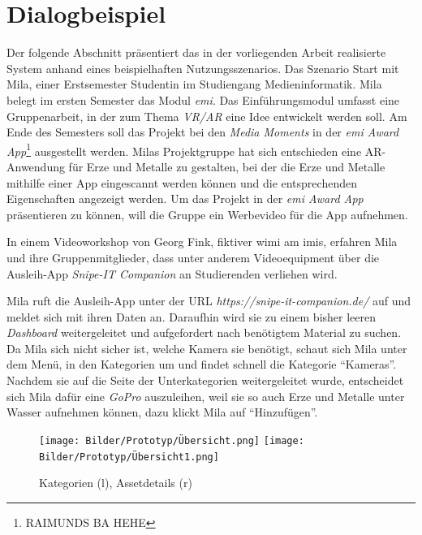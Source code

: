 \chapter{Dialogbeispiel}
\label{chapter-dialogbeispiel}

Der folgende Abschnitt präsentiert das in der vorliegenden Arbeit realisierte System anhand eines
beispielhaften Nutzungsszenarios. Das Szenario Start mit Mila, einer Erstsemester Studentin im
Studiengang Medieninformatik. Mila belegt im ersten Semester das Modul \textit{\ac{emi}}. Das
Einführungsmodul umfasst eine Gruppenarbeit, in der zum Thema \textit{VR/AR} eine Idee entwickelt
werden soll. Am Ende des Semesters soll das Projekt bei den \textit{Media Moments} in der
\textit{\ac{emi} Award App}\footnote{RAIMUNDS BA HEHE} ausgestellt werden. Milas Projektgruppe hat
sich entschieden eine AR-Anwendung für Erze und Metalle zu gestalten, bei der die Erze und Metalle
mithilfe einer App eingescannt werden können und die entsprechenden Eigenschaften angezeigt werden.
Um das Projekt in der \textit{\ac{emi} Award App} präsentieren zu können, will die Gruppe ein
Werbevideo für die App aufnehmen.

In einem Videoworkshop von Georg Fink, fiktiver \ac{wimi} am \ac{imis}, erfahren Mila und ihre
Gruppenmitglieder, dass unter anderem Videoequipment über die Ausleih-App \textit{Snipe-IT Companion} an
Studierenden verliehen wird.

Mila ruft die Ausleih-App unter der URL \textit{https://snipe-it-companion.de/} auf und meldet
sich mit ihren  Daten an. Daraufhin wird sie zu einem bisher leeren \textit{Dashboard}
weitergeleitet und aufgefordert nach benötigtem Material zu suchen. Da Mila sich nicht sicher ist,
welche Kamera sie benötigt, schaut sich Mila unter dem Menü, in den Kategorien um und findet
schnell die Kategorie \enquote{Kameras}. Nachdem sie auf die Seite der Unterkategorien
weitergeleitet wurde, entscheidet sich Mila dafür eine \textit{GoPro} auszuleihen, weil sie so auch
Erze und Metalle unter Wasser aufnehmen können, dazu klickt Mila auf \enquote{Hinzufügen}.

\begin{figure}[h]
    \centering
    \texttt{[image: Bilder/Prototyp/Übersicht.png]}\hspace{2em}
    \texttt{[image: Bilder/Prototyp/Übersicht1.png]}
    \label{fig:p4}
    \caption[Mockup: Kategorien, Assets, Assetdetails]{Kategorien (l), Assetdetails (r)}
\end{figure}

